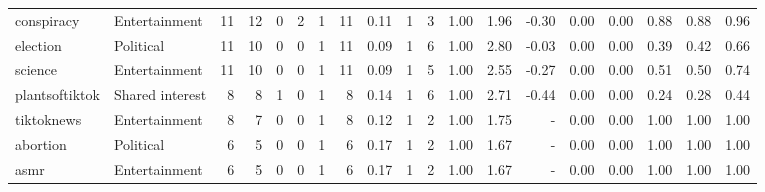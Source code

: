 \begin{tabular}{llrrrrrrrrrrrrrrrrr}
      conspiracy &   Entertainment &     11 &     12 &                           0 &                            2 &             1 &                         11 &     0.11 &    1 &      3 & 1.00 &   1.96 &                              -0.30 &   0.00 &         0.00 &                                0.88 &                                   0.88 &                                     0.96 \\
        election &       Political &     11 &     10 &                           0 &                            0 &             1 &                         11 &     0.09 &    1 &      6 & 1.00 &   2.80 &                              -0.03 &   0.00 &         0.00 &                                0.39 &                                   0.42 &                                     0.66 \\
         science &   Entertainment &     11 &     10 &                           0 &                            0 &             1 &                         11 &     0.09 &    1 &      5 & 1.00 &   2.55 &                              -0.27 &   0.00 &         0.00 &                                0.51 &                                   0.50 &                                     0.74 \\
  plantsoftiktok & Shared interest &      8 &      8 &                           1 &                            0 &             1 &                          8 &     0.14 &    1 &      6 & 1.00 &   2.71 &                              -0.44 &   0.00 &         0.00 &                                0.24 &                                   0.28 &                                     0.44 \\
      tiktoknews &   Entertainment &      8 &      7 &                           0 &                            0 &             1 &                          8 &     0.12 &    1 &      2 & 1.00 &   1.75 &                                - &   0.00 &         0.00 &                                1.00 &                                   1.00 &                                     1.00 \\
        abortion &       Political &      6 &      5 &                           0 &                            0 &             1 &                          6 &     0.17 &    1 &      2 & 1.00 &   1.67 &                                - &   0.00 &         0.00 &                                1.00 &                                   1.00 &                                     1.00 \\
            asmr &   Entertainment &      6 &      5 &                           0 &                            0 &             1 &                          6 &     0.17 &    1 &      2 & 1.00 &   1.67 &                                - &   0.00 &         0.00 &                                1.00 &                                   1.00 &                                     1.00 \\

\end{tabular}
